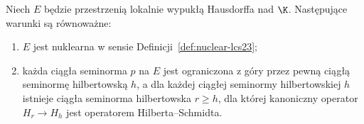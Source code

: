 \begin{twierdzenie}
\label{thm:hilbert-nuclear23}
Niech $E$ będzie przestrzenią lokalnie wypukłą Hausdorffa
nad $\K$. Następujące warunki są równoważne:
\begin{enumerate}[label=\textup{(\roman*)},leftmargin=*]
\item $E$ jest nuklearna w sensie
Definicji~\ref{def:nuclear-lcs23};
\item każda ciągła seminorma $p$ na $E$ jest ograniczona
z góry przez pewną ciągłą seminormę hilbertowską $h$,
a dla każdej ciągłej seminormy hilbertowskiej $h$ istnieje
ciągła seminorma hilbertowska $r\ge h$, dla której
kanoniczny operator $H_r\to H_h$ jest operatorem
Hilberta--Schmidta.
\end{enumerate}
\end{twierdzenie}
